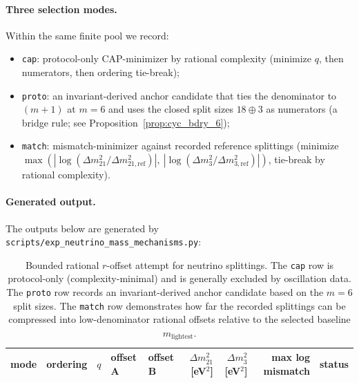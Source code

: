 \paragraph{Three selection modes.}
\AuditTag Within the same finite pool we record:
\begin{itemize}
\item \texttt{cap}: protocol-only CAP-minimizer by rational complexity (minimize $q$, then numerators, then ordering tie-break);
\item \texttt{proto}: an invariant-derived anchor candidate that ties the denominator to $(m+1)$ at $m=6$ and uses the closed split sizes $18\oplus 3$ as numerators (a bridge rule; see Proposition~\ref{prop:cyc_bdry_6});
\item \texttt{match}: mismatch-minimizer against recorded reference splittings (minimize $\max(|\log(\Delta m_{21}^2/\Delta m_{21,\mathrm{ref}}^2)|,\ |\log(\Delta m_3^2/\Delta m_{3,\mathrm{ref}}^2)|)$, tie-break by rational complexity).
\end{itemize}

\paragraph{Generated output.}
\AuditTag The outputs below are generated by \texttt{scripts/exp\_neutrino\_mass\_mechanisms.py}:

%

\begin{table}[t]
\centering
\scriptsize
\setlength{\tabcolsep}{5pt}
\renewcommand{\arraystretch}{1.15}
\begin{tabular}{lll l l r r r l}
\toprule
mode & ordering & $q$ & offset A & offset B & $\Delta m_{21}^2$ [eV$^2$] & $\Delta m_3^2$ [eV$^2$] & max log mismatch & status \\
\midrule
%
\end{tabular}
\caption{Bounded rational $r$-offset attempt for neutrino splittings. The \texttt{cap} row is protocol-only (complexity-minimal) and is generally excluded by oscillation data. The \texttt{proto} row records an invariant-derived anchor candidate based on the $m=6$ split sizes. The \texttt{match} row demonstrates how far the recorded splittings can be compressed into low-denominator rational offsets relative to the selected baseline $m_{\mathrm{lightest}}$.}
\label{tab:neutrino_splitting_depth_closure}
\end{table}

